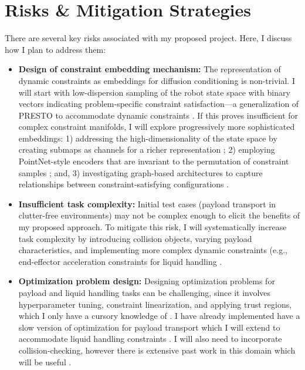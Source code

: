 \section{Risks \& Mitigation Strategies}

There are several key risks associated with my proposed project. Here, I discuss how I plan to address them:

\begin{itemize}
   \item \textbf{Design of constraint embedding mechanism:} The representation of dynamic constraints as embeddings for diffusion conditioning is non-trivial. I will start with low-dispersion sampling of the robot state space with binary vectors indicating problem-specific constraint satisfaction---a generalization of PRESTO to accommodate dynamic constraints \cite{seo2024presto}. If this proves insufficient for complex constraint manifolds, I will explore progressively more sophisticated embeddings: 1) addressing the high-dimensionality of the state space by creating submaps as channels for a richer representation \cite{krizhevsky2012imagenet}; 2) employing PointNet-style encoders that are invariant to the permutation of constraint samples \cite{qi2017pointnet}; and, 3) investigating graph-based architectures to capture relationships between constraint-satisfying configurations \cite{hamilton2017inductive}.
   \item \textbf{Insufficient task complexity:} Initial test cases (payload transport in clutter-free environments) may not be complex enough to elicit the benefits of my proposed approach. To mitigate this risk, I will systematically increase task complexity by introducing collision objects, varying payload characteristics, and implementing more complex dynamic constraints (e.g., end-effector acceleration constraints for liquid handling \cite{ichnowski2022gomp,abderezaei2024clutter}.
   \item \textbf{Optimization problem design:} Designing optimization problems for payload and liquid handling tasks can be challenging, since it involves hyperparameter tuning, constraint linearization, and applying trust regions, which I only have a cursory knowledge of \cite{schulman2013finding}. I have already implemented have a slow version of optimization for payload transport which I will extend to accommodate liquid handling constraints \cite{pasricha2025payload}. I will also need to incorporate collision-checking, however there is extensive past work in this domain which will be useful \cite{ichnowski2020deep}.
\end{itemize}

